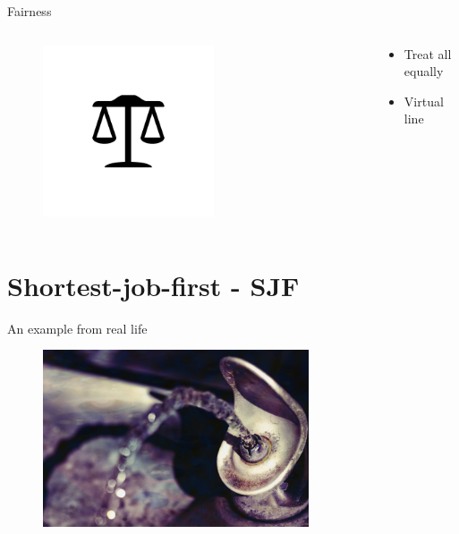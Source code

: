 \documentclass[10pt, compress, aspectratio=169]{beamer}
\begin{document}
\begin{frame}{Fairness}

  \begin{columns}[T]
    \begin{column}{.5\textwidth}
      \begin{figure}[ht]
        \centering
        \includegraphics[width=0.6\textwidth, keepaspectratio=true]{images/fairness.png}
      \end{figure}
    \end{column}

    \hfill
    \begin{column}{.5\textwidth}
      \begin{itemize}
        \item Treat all equally
        \item Virtual line
      \end{itemize}
    \end{column}
  \end{columns}

\end{frame}

\section{Shortest-job-first - SJF}
\begin{frame}{An example from real life}
  \begin{figure}[ht]
    \centering
    \includegraphics[width=0.7\textwidth, keepaspectratio=true]{images/sjf.jpg}
  \end{figure}
\end{frame}
\end{document}
